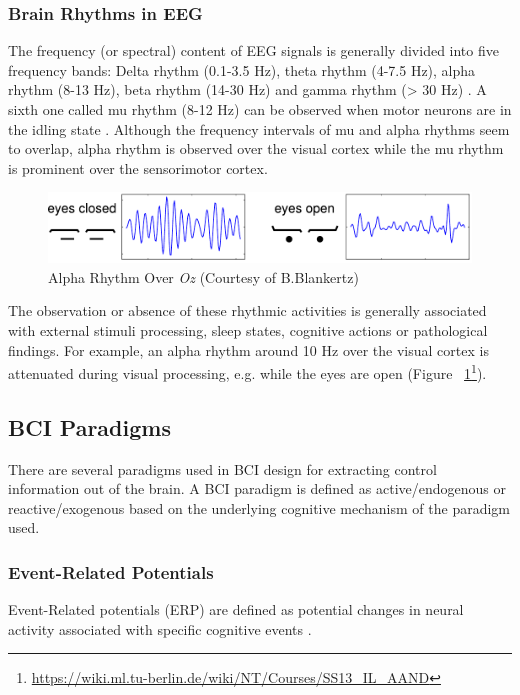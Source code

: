 \documentclass[12pt]{article}
\newcommand\mysubsection[1]{\subsection{#1}}
\newcommand\mysubsubsection[1]{\subsubsection{#1}}
\numberwithin{equation}{section}
\numberwithin{figure}{section}
\numberwithin{table}{section}
\begin{document}
\mysubsubsection{Brain Rhythms in EEG}
\par{
    The frequency (or spectral) content of EEG signals is generally divided into five frequency
    bands: Delta rhythm (0.1-3.5 Hz), theta rhythm (4-7.5 Hz), alpha rhythm (8-13 Hz),
    beta rhythm (14-30 Hz) and gamma rhythm (> 30 Hz) \citep{niedermeyer_electroencephalography:_2005}.
    A sixth one called mu rhythm (8-12 Hz) can be observed when motor neurons are in the idling
    state \citep{wang_practical_2010}. Although the frequency intervals of mu and
    alpha rhythms seem to overlap, alpha rhythm is observed over the visual cortex
    while the mu rhythm is prominent over the sensorimotor cortex.
}
    \par{
    \begin{figure}[ht]
        \centering
        \includegraphics[scale=0.8]{images/alpha_eyes}
        \caption[Alpha Rhythm Over Oz]{Alpha Rhythm Over \emph{Oz} (Courtesy of B.Blankertz)}
        \label{fig:eeg_alpha}
    \end{figure}

    The observation or absence of these rhythmic activities is generally associated
    with external stimuli processing, sleep states, cognitive actions or pathological
    findings. For example, an alpha rhythm around 10 Hz over the visual cortex
    is attenuated during visual processing, e.g. while the eyes are open (Figure ~\ref{fig:eeg_alpha}\footnote{\url{https://wiki.ml.tu-berlin.de/wiki/NT/Courses/SS13_IL_AAND}}).
}
\mysubsection{BCI Paradigms}
\par{
    There are several paradigms used in BCI design for extracting control information
    out of the brain. A BCI paradigm is defined as active/endogenous or
    reactive/exogenous based on the underlying cognitive mechanism of the paradigm used.
}
\mysubsubsection{Event-Related Potentials}
\par{
    Event-Related potentials (ERP) are defined as potential changes in
    neural activity associated with specific cognitive events \citep{luck_introduction_2005}.
}
\end{document}
